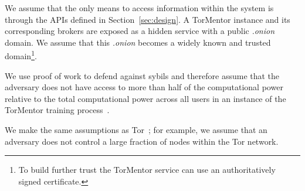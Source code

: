 We assume that the only means to access information within the system
is through the APIs defined in Section~\ref{sec:design}. A TorMentor
instance and its corresponding brokers are exposed as a hidden service
with a public \textit{.onion} domain. We assume that this 
\textit{.onion} becomes a widely known and trusted domain\footnote{To
build further trust the TorMentor service can use an authoritatively
signed certificate.}.

We use proof of work to defend against sybils and therefore assume that
the adversary does not have access to more than half of the
computational power relative to the total computational power across
all users in an instance of the TorMentor training 
process~\cite{Back:2002}.

We make the same assumptions as Tor~\cite{Dingledine:2004}; for
example, we assume that an adversary does not control a large fraction
of nodes within the Tor network. %
